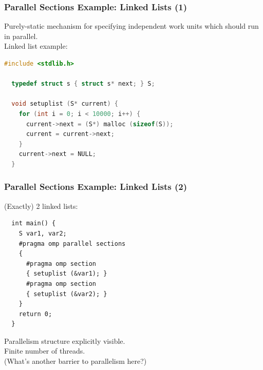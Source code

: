 \begin{frame}[fragile]
  \frametitle{Parallel Sections Example: Linked Lists (1)}

\large
  
  Purely-static mechanism for specifying independent work units which should run in
  parallel.\\[1em]

  Linked list example:

{\small
\begin{lstlisting}[language=C,morekeywords={foreach,pragma,omp,parallel,single,nowait,task,untied,barrier,taskyield}]
  #include <stdlib.h>

  typedef struct s { struct s* next; } S;

  void setuplist (S* current) {
    for (int i = 0; i < 10000; i++) {
      current->next = (S*) malloc (sizeof(S));
      current = current->next;
    }
    current->next = NULL;
  }
  \end{lstlisting}
}

  


\end{frame}

\begin{frame}[fragile]
  \frametitle{Parallel Sections Example: Linked Lists (2)}
  

  (Exactly) 2 linked lists:
{\small
  \begin{lstlisting}
  int main() {
    S var1, var2;
    #pragma omp parallel sections
    {
      #pragma omp section
      { setuplist (&var1); }
      #pragma omp section
      { setuplist (&var2); }
    }
    return 0;
  }
\end{lstlisting}}

  Parallelism structure explicitly visible.\\[1em]
  Finite number of threads.\\[1em]
  (What's another barrier to parallelism here?)

  


\end{frame}


